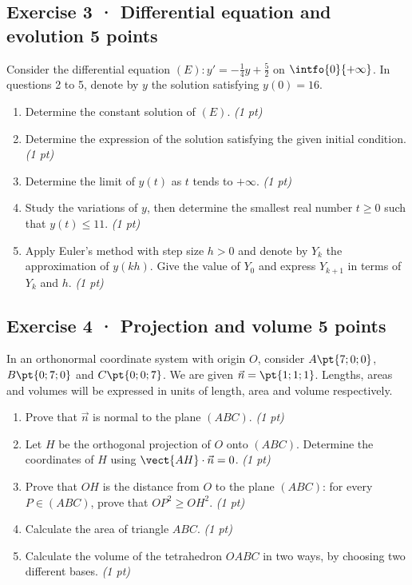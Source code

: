 \mxnewpage{}

\subsection*{Exercise 3 · Differential equation and evolution \hfill 5 points}Consider the differential equation $(E):y'=-\frac1{4}y+\frac{5}{2}$ on $\intfo{0}{+\infty}$. In questions 2 to 5, denote by $y$ the solution satisfying $y(0)=16$.

\begin{enumerate}

\item Determine the constant solution of $(E)$. \hfill\textit{(1 pt)}

\item Determine the expression of the solution satisfying the given initial condition. \hfill\textit{(1 pt)}

\item Determine the limit of $y(t)$ as $t$ tends to $+\infty$. \hfill\textit{(1 pt)}

\item Study the variations of $y$, then determine the smallest real number $t\ge0$ such that $y(t)\le11$. \hfill\textit{(1 pt)}

\item Apply Euler's method with step size $h>0$ and denote by $Y_k$ the approximation of $y(kh)$. Give the value of $Y_0$ and express $Y_{k+1}$ in terms of $Y_k$ and $h$. \hfill\textit{(1 pt)}

\end{enumerate}

\subsection*{Exercise 4 · Projection and volume \hfill 5 points}In an orthonormal coordinate system with origin $O$, consider $A\pt{7;0;0}$, $B\pt{0;7;0}$ and $C\pt{0;0;7}$. We are given $\vec n=\pt{1;1;1}$. Lengths, areas and volumes will be expressed in units of length, area and volume respectively.

\begin{enumerate}

\item Prove that $\vec n$ is normal to the plane $(ABC)$. \hfill\textit{(1 pt)}

\item Let $H$ be the orthogonal projection of $O$ onto $(ABC)$. Determine the coordinates of $H$ using $\vect{AH}\cdot\vec n=0$. \hfill\textit{(1 pt)}

\item Prove that $OH$ is the distance from $O$ to the plane $(ABC)$: for every $P\in(ABC)$, prove that $OP^2\ge OH^2$. \hfill\textit{(1 pt)}

\item Calculate the area of triangle $ABC$. \hfill\textit{(1 pt)}

\item Calculate the volume of the tetrahedron $OABC$ in two ways, by choosing two different bases. \hfill\textit{(1 pt)}

\end{enumerate}

